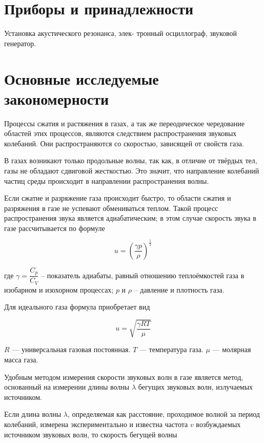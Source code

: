 \documentclass[12pt,a4paper]{article}%
\begin{document}
\section*{Приборы и принадлежности}

Установка акустического резонанса, элек-
тронный осциллограф, звуковой генератор.

\section*{Основные исследуемые закономерности}

Процессы сжатия и растяжения в газах, а так же переодическое чередование областей этих процессов, являются следствием распространения звуковых колебаний. Они распространяются со скоростью, зависящей от свойств газа.

В газах возникают только продольные волны, так как, в отличие от твёрдых тел, газы не обладают сдвиговой жесткостью.
Это значит, что направление колебаний частиц среды происходит в направлении
распространения волны.

Если сжатие и разряжение газа происходит быстро, то области сжатия и
разряжения в газе не успевают обмениваться теплом. Такой процесс распространения звука является адиабатическим; в этом случае скорость звука в газе рассчитывается по формуле

\begin{equation}
	u = (\dfrac{\gamma p}{\rho})^{\dfrac{_1}{^2}}
\end{equation}

где $ \gamma = \dfrac{C_p}{C_V}$ – показатель адиабаты, равный отношению теплоёмкостей газа в изобарном и изохорном процессах; 
$p$ и $\rho$ – давление и плотность газа. 

Для идеального газа формула приобретает вид

\begin{equation}
	u = \sqrt{\dfrac{\gamma RT}{\mu}}
\end{equation}

$R$ --- универсальная газовая постоянная. $T$ --- температура газа. $\mu$ --- молярная масса газа.

Удобным методом измерения скорости звуковых волн в газе является
метод, основанный на измерении длины волны $\lambda$ бегущих звуковых волн, излучаемых источником. 

Если длина волны $\lambda$, определяемая как расстояние,
проходимое волной за период колебаний, измерена экспериментально и известна частота $v$ возбуждаемых источником звуковых волн, то скорость бегущей волны
\end{document}
